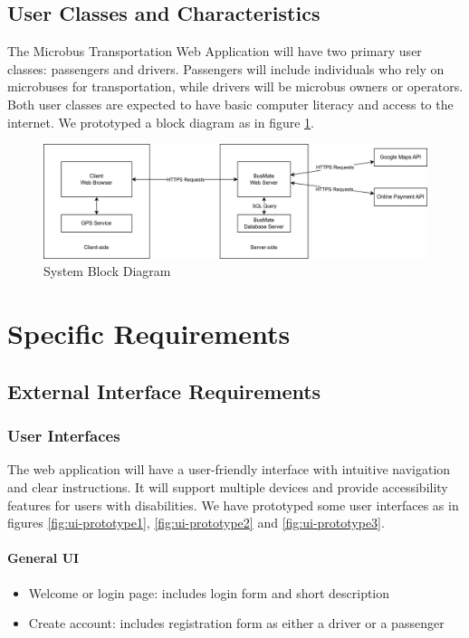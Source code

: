 \documentclass{BusMateSRS}
\begin{document}
\section{User Classes and Characteristics}
The Microbus Transportation Web Application will have two primary user classes: 
passengers and drivers. Passengers will include individuals who rely on 
microbuses for transportation, while drivers will be microbus owners or 
operators. 
Both user classes are expected to have basic computer literacy and 
access to the internet.
We prototyped a block diagram as in figure \ref{fig:system-block-diagram}.

\begin{figure}[h!]
  \centering
  \includegraphics[width=\columnwidth]{drawings/system-block-diagram.drawio.png}
  \caption{System Block Diagram}
  \label{fig:system-block-diagram}
\end{figure}

\chapter{Specific Requirements}
\section{External Interface Requirements}
\subsection{User Interfaces}
The web application will have a user-friendly interface with intuitive 
navigation and clear instructions. It will support multiple devices and 
provide accessibility features for users with disabilities.
We have prototyped some user interfaces as in figures 
\ref{fig:ui-prototype1}, \ref{fig:ui-prototype2} and \ref{fig:ui-prototype3}.

\subsubsection{General UI}
\begin{itemize}
  \item Welcome or login page: 
    includes login form and short description
  \item Create account: 
    includes registration form as either a driver or a passenger
\end{itemize}
\end{document}
